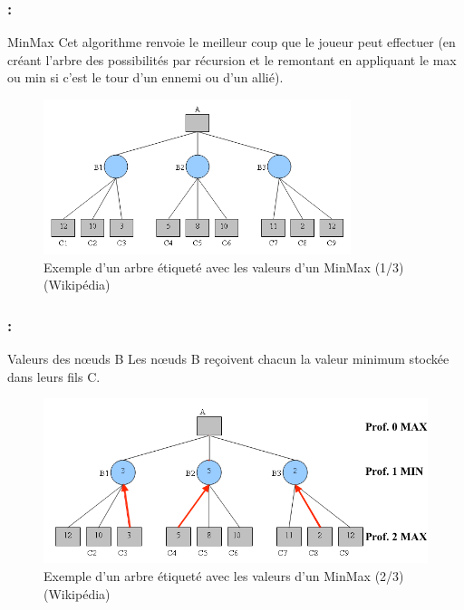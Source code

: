 \documentclass[9pt]{beamer}
\begin{document}
\begin{frame}[fragile]
\frametitle{\insertsectionhead : \insertsubsectionhead}
\begin{block}{MinMax}
Cet algorithme renvoie le meilleur coup que le joueur peut effectuer (en créant l’arbre des possibilités par récursion et le remontant en appliquant le max ou min si c’est le tour d’un ennemi ou d’un allié). 
\end{block}
\begin{figure}[h]
    \begin{center}
    \vspace{-5px}
    \caption{Exemple d’un arbre étiqueté avec les valeurs d'un MinMax (1/3) (Wikipédia)}
    \vspace{-5px}
    \includegraphics[width=0.8\textwidth]{figures/minmax1.png}
    \end{center}
\end{figure}
\end{frame}

\begin{frame}[fragile]
\frametitle{\insertsectionhead : \insertsubsectionhead}
\begin{block}{Valeurs des nœuds B}
Les nœuds B reçoivent chacun la valeur minimum stockée dans leurs fils C.
\end{block}
\begin{figure}[h]
    \begin{center}
    \vspace{-5px}
    \caption{Exemple d’un arbre étiqueté avec les valeurs d'un MinMax (2/3) (Wikipédia)}
    \vspace{-5px}
    \includegraphics[width=1\textwidth]{figures/minmax2.png}
    \end{center}
\end{figure}
\end{frame}
\end{document}
